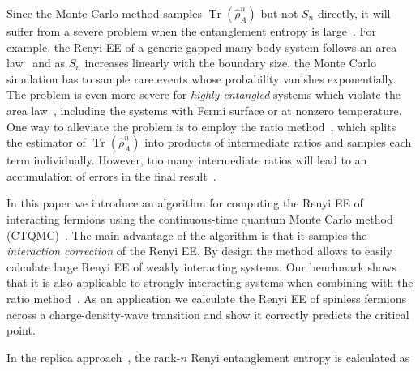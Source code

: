 \documentclass[twocolumn,english,prl,showpacs]{revtex4}
\DeclareMathOperator{\Tr}{Tr}
\newcommand{\red}[1]{[{\bf \color{red}{#1}}]}
\begin{document}
Since the Monte Carlo method samples $\Tr (\hat{\rho}_{A}^{n})$ but not $S_{n}$ directly, it will suffer from a severe problem when the entanglement entropy is large~\cite{Hastings:2010dca, Zhang:2011ka, Grover:2013cs}. For example, the Renyi EE of a generic gapped many-body system follows an area law~\cite{Eisert:2010hq} and as $S_{n}$ increases linearly with the boundary size, the Monte Carlo simulation has to sample rare events whose probability vanishes exponentially. The problem is even more severe for \emph{highly entangled} systems which violate the area law~\cite{PhysRevLett.96.010404, PhysRevLett.96.100503, PhysRevLett.105.050502,PhysRevX.2.011012, PhysRevLett.111.210402,PhysRevLett.112.160403}, including the systems with Fermi surface or at nonzero temperature. One way to alleviate the problem is to employ the ratio method~\cite{Hastings:2010dca, Humeniuk:2012cq}, which splits the estimator of $\Tr(\hat{\rho}_{A}^{n})$ into products of intermediate ratios and samples each term individually. However, too many intermediate ratios will lead to an accumulation of errors in the final result~\cite{Humeniuk:2012cq}. 

In this paper we introduce an algorithm for computing the Renyi EE of interacting fermions using the continuous-time quantum Monte Carlo method (CTQMC)~\cite{Rubtsov:2005iw, Gull:2011jd}. The main advantage of the algorithm is that it samples the \emph{interaction correction} of the Renyi EE. By design the method allows to easily calculate large Renyi EE of  weakly interacting systems. Our benchmark shows that it is also applicable to strongly interacting systems when combining  with the ratio method~\cite{Hastings:2010dca, Humeniuk:2012cq}. As an application we calculate the Renyi EE of spinless fermions across a charge-density-wave transition and show it correctly predicts the critical point. 

In the replica approach~\cite{Calabrese:2004hl, Melko:2010jda}, the rank-$n$ Renyi entanglement entropy is calculated as 
\end{document}
